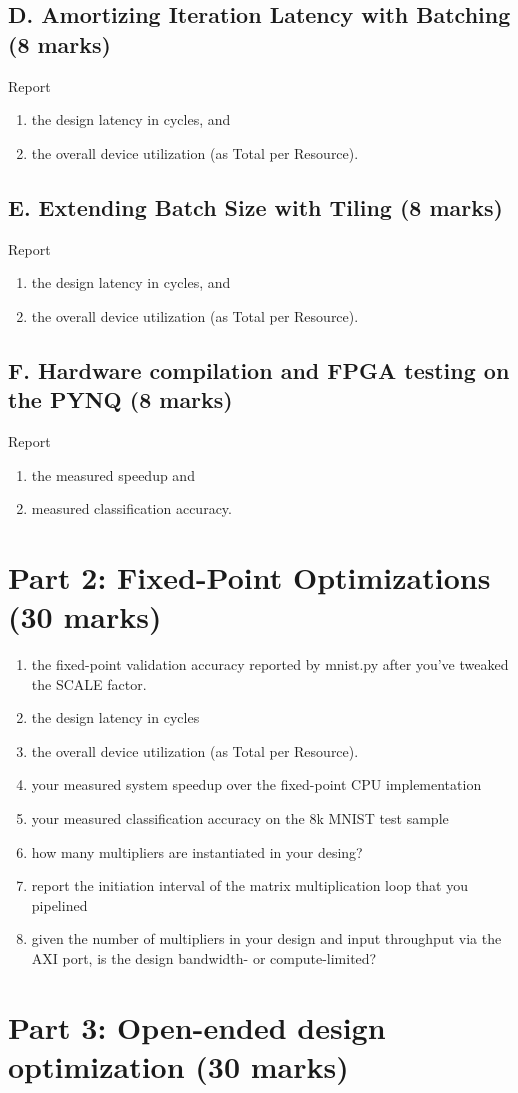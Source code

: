 \documentclass[screen,nonacm]{acmart}
\begin{document}
\subsection{D. Amortizing Iteration Latency with Batching (8 marks)}

Report \begin{enumerate}
  \item the design latency in cycles, and 
  \item the overall device utilization (as Total per Resource).
\end{enumerate}

\subsection{E. Extending Batch Size with Tiling (8 marks)}

Report \begin{enumerate}
  \item the design latency in cycles, and 
  \item the overall device utilization (as Total per Resource).
\end{enumerate}

\subsection{F. Hardware compilation and FPGA testing on the PYNQ (8 marks)}

Report 
\begin{enumerate}
  \item the measured speedup and 
  \item measured classification accuracy.
\end{enumerate}

\section{Part 2: Fixed-Point Optimizations (30 marks)}

\begin{enumerate}
  \item the fixed-point validation accuracy reported by mnist.py after you've tweaked the SCALE factor.
  \item the design latency in cycles
  \item the overall device utilization (as Total per Resource).
  \item your measured system speedup over the fixed-point CPU implementation
  \item your measured classification accuracy on the 8k MNIST test sample
  \item how many multipliers are instantiated in your desing?
  \item report the initiation interval of the matrix multiplication loop that you pipelined
  \item given the number of multipliers in your design and input throughput via the AXI port, is the design bandwidth- or compute-limited?
\end{enumerate}

\section{Part 3: Open-ended design optimization (30 marks)}


% 
% 

\clearpage
\appendix
\end{document}
